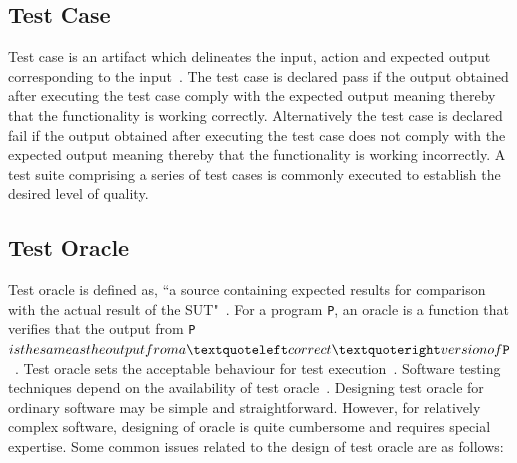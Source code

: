\subsection{Test Case}
Test case is an artifact which delineates the input, action and expected output corresponding to the input~\cite{ahmed2010software}. The test case is declared pass if the output obtained after executing the test case comply with the expected output meaning thereby that the functionality is working correctly. Alternatively the test case is declared fail if the output obtained after executing the test case does not comply with the expected output meaning thereby that the functionality is working incorrectly. %
A test suite comprising a series of test cases is commonly executed to establish the desired level of quality.


\subsection{Test Oracle}
Test oracle is defined as, ``a source containing expected results for comparison with the actual result of the SUT"~\cite{ahmed2010software}. For a program \verb+P+, an oracle is a function that verifies that the output from \verb+P+$ is the same as the output from a ‘correct’ version of \verb+P+$~\cite{howden1986functional}. Test oracle sets the acceptable behaviour for test execution~\cite{baresi2001test}. Software testing techniques depend on the availability of test oracle~\cite{gaudel2010software}. Designing test oracle for ordinary software may be simple and straightforward. However, for relatively complex software, designing of oracle is quite cumbersome and requires special expertise. 
Some common issues related to the design of test oracle are as follows:

